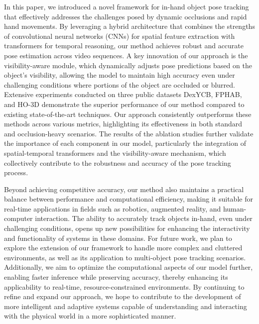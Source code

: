 In this paper, we introduced a novel framework for in-hand object pose tracking that effectively addresses the challenges posed by dynamic occlusions and rapid hand movements. By leveraging a hybrid architecture that combines the strengths of convolutional neural networks (CNNs) for spatial feature extraction with transformers for temporal reasoning, our method achieves robust and accurate pose estimation across video sequences. A key innovation of our approach is the visibility-aware module, which dynamically adjusts pose predictions based on the object's visibility, allowing the model to maintain high accuracy even under challenging conditions where portions of the object are occluded or blurred. Extensive experiments conducted on three public datasets DexYCB, FPHAB, and HO-3D demonstrate the superior performance of our method compared to existing state-of-the-art techniques. Our approach consistently outperforms these methods across various metrics, highlighting its effectiveness in both standard and occlusion-heavy scenarios. The results of the ablation studies further validate the importance of each component in our model, particularly the integration of spatial-temporal transformers and the visibility-aware mechanism, which collectively contribute to the robustness and accuracy of the pose tracking process.

Beyond achieving competitive accuracy, our method also maintains a practical balance between performance and computational efficiency, making it suitable for real-time applications in fields such as robotics, augmented reality, and human-computer interaction. The ability to accurately track objects in-hand, even under challenging conditions, opens up new possibilities for enhancing the interactivity and functionality of systems in these domains. For future work, we plan to explore the extension of our framework to handle more complex and cluttered environments, as well as its application to multi-object pose tracking scenarios. Additionally, we aim to optimize the computational aspects of our model further, enabling faster inference while preserving accuracy, thereby enhancing its applicability to real-time, resource-constrained environments. By continuing to refine and expand our approach, we hope to contribute to the development of more intelligent and adaptive systems capable of understanding and interacting with the physical world in a more sophisticated manner. \\

